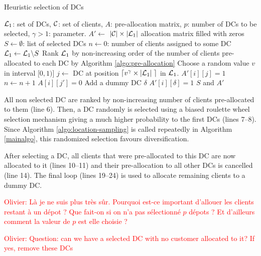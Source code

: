 \documentclass[a4paper,10pt]{article}
\begin{document}
\begin{linenumbers}
\begin{algorithm}
	\caption{Heuristic selection of DCs}
	\label{algo:location-sampling}
	\begin{algorithmic}[1]
		\REQUIRE $\mathcal{L}_1$: set of DCs, $\mathcal{C}$: set of clients, $A$: pre-allocation matrix, $p$: number of DCs to be selected, $\gamma>1$: parameter.
		\STATE  $A' \leftarrow$  $|\mathcal{C}| \times |\mathcal{L}_1|$ allocation matrix filled with zeros
		\STATE $S \leftarrow \emptyset$: list of selected DCs
		\STATE $n \leftarrow 0$: number of clients assigned to some DC
			\STATE $ \mathcal{L}_1 \leftarrow \mathcal{L}_1 \backslash S$
			\STATE Rank $\mathcal{L}_1$ by non-increasing order of the number of clients pre-allocated to each DC by Algorithm 
\ref{algo:pre-allocation}
			\STATE Choose a random value $v$ in interval $[0,1)$]
			\STATE $j \leftarrow$ DC at position $\lceil v^\gamma \times |\mathcal{L}_1| \; \rceil$ in $\mathcal{L}_1$.
					\STATE $A'[i][j] = 1$
					\STATE $n \leftarrow n+1$
						\STATE $A[i][j'] = 0$ 
					\ENDFOR
				\ENDIF		
			\ENDFOR
		\ENDWHILE
			\STATE Add a dummy DC $\delta$
				\STATE $A'[i][\delta]=1$
			\ENDFOR
		\ENDIF
		\RETURN $S$ and $A'$
	\end{algorithmic}
\end{algorithm}

All non selected DC are ranked by non-increasing number of clients pre-allocated to them (line 6).
Then, a DC randomly is selected using a biased roulette wheel selection mechanism giving a much higher probability to the first DCs (lines 7--8). 
Since Algorithm \ref{algo:location-sampling} is called repeatedly in Algorithm \ref{mainalgo}, this randomized selection favours diversification. 

After selecting a DC, all clients that were pre-allocated to this DC are now allocated to it (lines 10--11) 
and their pre-allocation to all other DCs is cancelled (line 14). 
The final loop (lines 19--24) is used to allocate remaining clients to a dummy DC. 

\textcolor{red}{Olivier: Là je ne suis plus très sûr. Pourquoi est-ce important d'allouer les clients restant à un dépot ? Que fait-on si on n'a pas sélectionné $p$ dépots ? Et d'ailleurs comment la valeur de $p$ est elle choisie ? }

\textcolor{red}{Olivier: Question: can we have a selected DC with no customer allocated to it? If yes, remove these DCs}



\end{linenumbers}
\end{document}
